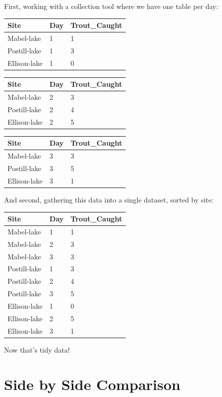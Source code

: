 \documentclass[
]{book}
\begin{document}
First, working with a collection tool where we have one table per day:

\begin{longtable}[]{@{}lll@{}}
\toprule()
Site & Day & Trout\_Caught \\
\midrule()
\endhead
Mabel-lake & 1 & 1 \\
Postill-lake & 1 & 3 \\
Ellison-lake & 1 & 0 \\
\bottomrule()
\end{longtable}

\begin{longtable}[]{@{}lll@{}}
\toprule()
Site & Day & Trout\_Caught \\
\midrule()
\endhead
Mabel-lake & 2 & 3 \\
Postill-lake & 2 & 4 \\
Ellison-lake & 2 & 5 \\
\bottomrule()
\end{longtable}

\begin{longtable}[]{@{}lll@{}}
\toprule()
Site & Day & Trout\_Caught \\
\midrule()
\endhead
Mabel-lake & 3 & 3 \\
Postill-lake & 3 & 5 \\
Ellison-lake & 3 & 1 \\
\bottomrule()
\end{longtable}

And second, gathering this data into a single dataset, sorted by site:

\begin{longtable}[]{@{}lll@{}}
\toprule()
Site & Day & Trout\_Caught \\
\midrule()
\endhead
Mabel-lake & 1 & 1 \\
Mabel-lake & 2 & 3 \\
Mabel-lake & 3 & 3 \\
Postill-lake & 1 & 3 \\
Postill-lake & 2 & 4 \\
Postill-lake & 3 & 5 \\
Ellison-lake & 1 & 0 \\
Ellison-lake & 2 & 5 \\
Ellison-lake & 3 & 1 \\
\bottomrule()
\end{longtable}

Now that's tidy data!

\hypertarget{side-by-side-comparison}{%
\section{Side by Side Comparison}\label{side-by-side-comparison}}
\end{document}
